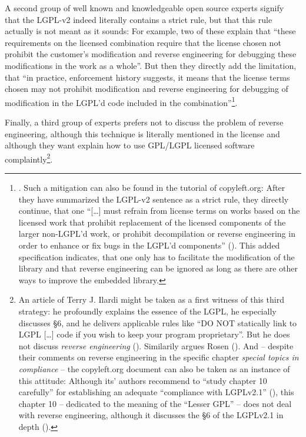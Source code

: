 A second group of well known and knowledgeable open source experts signify that
the LGPL-v2 indeed literally contains a strict rule, but that this rule actually
is not meant as it sounds: For example, two of these explain that \enquote{these
requirements on the licensed combination require that the license chosen not
prohibit the customer’s modification and reverse engineering for debugging these
modifications in the work as a whole}. But then they directly add the
limitation, that \enquote{in practice, enforcement history suggests, it means
that the license terms chosen may not prohibit modification and reverse
engineering for debugging of modification in the LGPL’d code included in the
combination}\footnote{\cite[cf.][\nopage wp., chapter LGPLv2.1, section
6]{MogCho2014a}. Such a mitigation can also be found in the tutorial of
copyleft.org: After they have summarized the LGPL-v2 sentence as a strict rule,
they directly continue, that one \enquote{[\ldots] must refrain from license
terms on works based on the licensed work that prohibit replacement of the
licensed components of the larger non-LGPL'd work, or prohibit decompilation or
reverse engineering in order to enhance or fix bugs in the LGPL'd components}
(\cite[cf.][86]{KuhSebGin2014a}). This added specification indicates, that one
only has to facilitate the modification of the library and that reverse
engineering can be ignored as long as there are other ways to improve the
embedded library.}.

Finally, a third group of experts prefers not to discuss the problem of reverse
engineering, although this technique is literally mentioned in the license and
although they want explain how to use GPL/LGPL licensed software
complaintly\footnote{An article of Terry J. Ilardi might be taken as a first
witness of this third strategy: he profoundly explains the essence of the LGPL,
he especially discusses §6, and he delivers applicable rules like \enquote{DO
NOT statically link to LGPL [\ldots] code if you wish to keep your program
proprietary}. But he does not discuss \emph{reverse engineering}
(\cite[cf.][5f]{Ilardi2010a}). Similarily argues Rosen
(\cite[cf.][121ff]{Rosen2005a}). And -- despite their comments on reverse
engineering in the specific chapter \emph{special topics in compliance} -- the
copyleft.org document can also be taken as an instance of this attitude:
Although its' authors recommend to \enquote{study chapter 10 carefully} for
establishing an adequate \enquote{compliance with LGPLv2.1}
(\cite[cf.][86]{KuhSebGin2014a}), this chapter 10 -- dedicated to the meaning of
the \enquote{Lesser GPL} -- does not deal with reverse engineering, although it
discusses the §6 of the LGPLv2.1 in depth (\cite[cf.][56ff, esp.
60f]{KuhSebGin2014a}).}.

